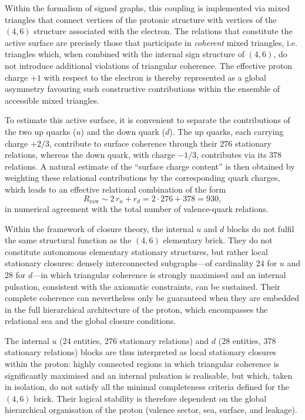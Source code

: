 \documentclass[11pt,a4paper]{article}
\begin{document}
Within the formalism of signed graphs, this coupling is implemented via mixed triangles that connect vertices of the protonic structure with vertices of the \((4,6)\) structure associated with the electron. The relations that constitute the active surface are precisely those that participate in \emph{coherent} mixed triangles, i.e. triangles which, when combined with the internal sign structure of \((4,6)\), do not introduce additional violations of triangular coherence. The effective proton charge \(+1\) with respect to the electron is thereby represented as a global asymmetry favouring such constructive contributions within the ensemble of accessible mixed triangles.

To estimate this active surface, it is convenient to separate the contributions of the two up quarks (\(u\)) and the down quark (\(d\)). The up quarks, each carrying charge \(+2/3\), contribute to surface coherence through their \(276\) stationary relations, whereas the down quark, with charge \(-1/3\), contributes via its \(378\) relations. A natural estimate of the “surface charge content” is then obtained by weighting these relational contributions by the corresponding quark charges, which leads to an effective relational combination of the form
\[
R_{\mathrm{raw}} \sim 2\, r_u + r_d
= 2 \cdot 276 + 378
= 930,
\]
in numerical agreement with the total number of valence-quark relations.

Within the framework of closure theory, the internal \(u\) and \(d\) blocks do not fulfil the same structural function as the \((4,6)\) elementary brick. They do not constitute autonomous elementary stationary structures, but rather local stationary closures: densely interconnected subgraphs—of cardinality \(24\) for \(u\) and \(28\) for \(d\)—in which triangular coherence is strongly maximised and an internal pulsation, consistent with the axiomatic constraints, can be sustained. Their complete coherence can nevertheless only be guaranteed when they are embedded in the full hierarchical architecture of the proton, which encompasses the relational sea and the global closure conditions.

The internal \(u\) (24 entities, 276 stationary relations) and \(d\) (28 entities, 378 stationary relations) blocks are thus interpreted as local stationary closures within the proton: highly connected regions in which triangular coherence is significantly maximised and an internal pulsation is realisable, but which, taken in isolation, do not satisfy all the minimal completeness criteria defined for the \((4,6)\) brick. Their logical stability is therefore dependent on the global hierarchical organisation of the proton (valence sector, sea, surface, and leakage).
\end{document}
